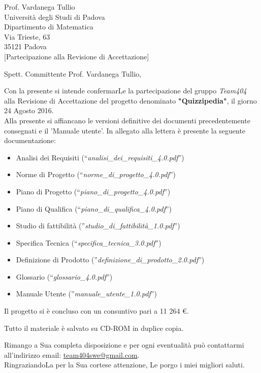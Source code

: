 \documentclass[boldsubject,shortindent,a4paper,11pt]{letteracdp}
\date{23 Agosto 2016}
\begin{document}
\begin{letter}{	Prof. Vardanega Tullio \\
				Universit\`a degli Studi di Padova \\
				Dipartimento di Matematica \\
				Via Trieste, 63 \\
				35121 Padova\\
				}
[Partecipazione alla Revisione di Accettazione]
\opening{Spett. Committente Prof. Vardanega Tullio,}
\noindent
Con la presente si intende confermarLe la partecipazione del gruppo \emph{Team404} alla Revisione di Accettazione del progetto denominato \textbf{"Quizzipedia"}, il giorno 24 Agosto 2016.
\\
\noindent
Alla presente si affiancano le versioni definitive dei documenti precedentemente consegnati e il 'Manuale utente'.
\newline
\noindent
In allegato alla lettera è presente la seguente documentazione:
\begin{itemize}
	\item Analisi dei Requisiti (``\textit{analisi\_dei\_requisiti\_4.0.pdf}'')
	\item Norme di Progetto (``\textit{norme\_di\_progetto\_4.0.pdf}'')
	\item Piano di Progetto (``\textit{piano\_di\_progetto\_4.0.pdf}'')
	\item Piano di Qualifica (``\textit{piano\_di\_qualifica\_4.0.pdf}'')
	\item Studio di fattibilità (''\textit{studio\_di\_fattibilità\_1.0.pdf}'')
	\item Specifica Tecnica (``\textit{specifica\_tecnica\_3.0.pdf}'')
	\item Definizione di Prodotto (''\textit{definizione\_di\_prodotto\_2.0.pdf}'')
	\item Glossario (``\textit{glossario\_4.0.pdf}'')
	\item Manuale Utente (''\textit{manuale\_utente\_1.0.pdf}'')
\end{itemize}

\noindent
Il progetto si è concluso con un consuntivo pari a 11 264 €.

\noindent
Tutto il materiale è salvato su CD-ROM in duplice copia.


\closing{Rimango a Sua completa disposizione e per ogni eventualit\`a pu\`o contattarmi all'indirizzo email: \url{team404swe@gmail.com}.\\RingraziandoLa per la Sua cortese attenzione, Le porgo i miei migliori saluti.}
\end{letter}
\end{document}
